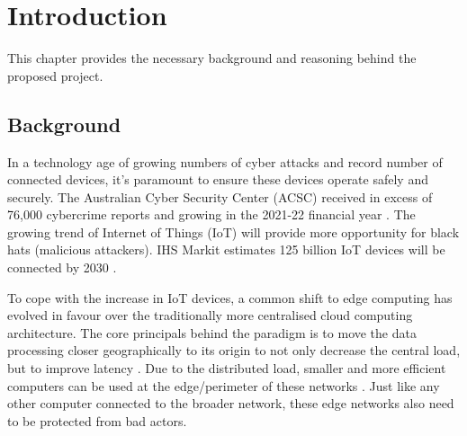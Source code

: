 \chapter[Introduction]{Introduction}
\label{Chap:Intro}




This chapter provides the necessary background and reasoning behind the proposed project. 

\section{Background }


In a technology age of growing numbers of cyber attacks and record number of connected devices, it's 
paramount to ensure these devices operate safely and securely. The Australian Cyber Security Center (ACSC) received in 
excess of 76,000 cybercrime reports and growing in the 2021-22 financial year \cite{acsc_2022}. The growing trend of Internet of Things (IoT) will provide 
more opportunity for black hats (malicious attackers). IHS Markit estimates 125 billion IoT devices will be connected by 2030 \cite{IHS_iot}. 

To cope with the increase in IoT devices, a common shift to edge computing has evolved in favour over the traditionally more centralised cloud computing 
architecture. The core principals behind the paradigm is to move the data processing closer geographically to its origin to not only decrease the 
central load, but to improve latency \cite{EdgeComputingPerspectives}. Due to the distributed load, smaller and more efficient computers can be used 
at the edge/perimeter of these networks \cite{EdgeComputingPerspectives}. Just like any other computer connected to the broader network, these 
edge networks also need to be protected from bad actors.



